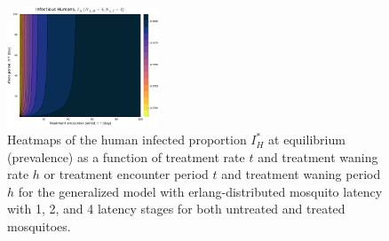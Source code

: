\documentclass[11pt]{article}
\begin{document}
\begin{figure}[H]
  \includegraphics[width=0.4\textwidth]{../../fig/Ih_periods_txh_4x4_uncal.pdf}
  \caption{Heatmaps of the human infected proportion $I_H^*$ at equilibrium (prevalence) as a function of treatment rate $t$ and treatment waning rate $h$ or treatment encounter period $t$ and treatment waning period $h$ for the generalized model with erlang-distributed mosquito latency with 1, 2, and 4 latency stages for both untreated and treated mosquitoes.}
\end{figure}
\end{document}
